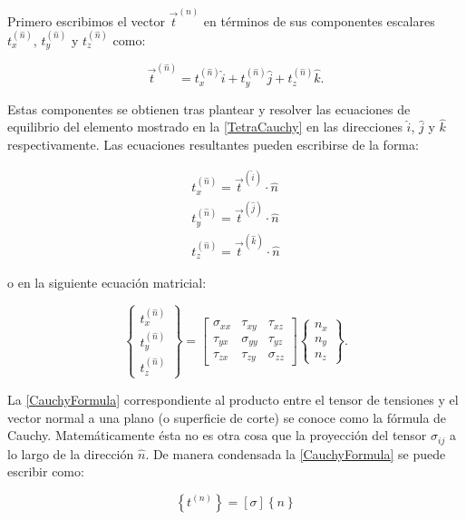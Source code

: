 \documentclass[../notas medios.tex]{subfiles}
\begin{document}
Primero escribimos el vector ${{\vec t}^{(n)}}$ en términos de sus componentes escalares $t_x^{(\hat n)}$, $t_y^{(\hat n)}$ y $t_z^{(\hat n)}$  como:


\[{{\vec t}^{(\hat n)}} = t_x^{(\hat n)}\hat i + t_y^{(\hat n)}\hat j + t_z^{(\hat n)}\hat k.\]

Estas componentes se obtienen tras plantear y resolver las ecuaciones de equilibrio del elemento mostrado en la \cref{TetraCauchy} en las direcciones $\hat{i}$, $\hat{j}$  y $\hat{k}$ respectivamente. Las ecuaciones resultantes pueden escribirse de la forma:


\begin{align*}
t_x^{(\hat n)} = {{\vec t}^{(\hat i)}} \cdot \hat n\\
t_y^{(\hat n)} = {{\vec t}^{(\hat j)}} \cdot \hat n\\
t_z^{(\hat n)} = {{\vec t}^{(\hat k)}} \cdot \hat n
\end{align*}

o en la siguiente ecuación matricial:

\begin{equation}
\left\{ {\begin{array}{*{20}{c}}
{t_x^{(\hat n)}}\\
{t_y^{(\hat n)}}\\
{t_z^{(\hat n)}}
\end{array}} \right\} = \left[ {\begin{array}{*{20}{c}}
{{\sigma _{xx}}}&{{\tau _{xy}}}&{{\tau _{xz}}}\\
{{\tau _{yx}}}&{{\sigma _{yy}}}&{{\tau _{yz}}}\\
{{\tau _{zx}}}&{{\tau _{zy}}}&{{\sigma _{zz}}}
\end{array}} \right]\left\{ {\begin{array}{*{20}{c}}
{{n_x}}\\
{{n_y}}\\
{{n_z}}
\end{array}} \right\}.
\label{CauchyFormula}
\end{equation}

La \cref{CauchyFormula} correspondiente al producto entre el tensor de tensiones y el vector normal a una plano (o superficie de corte) se conoce como la fórmula de Cauchy. Matemáticamente ésta no es otra cosa que la proyección del tensor $\sigma_{ij}$ a lo largo de la dirección $\hat{n}$. De manera condensada la \cref{CauchyFormula} se puede escribir como:

\begin{equation}
\left\{ {{t^{(n)}}} \right\} = \left[ \sigma  \right]\left\{ n \right\}
\label{CauchyFormulaC}
\end{equation}
\end{document}
